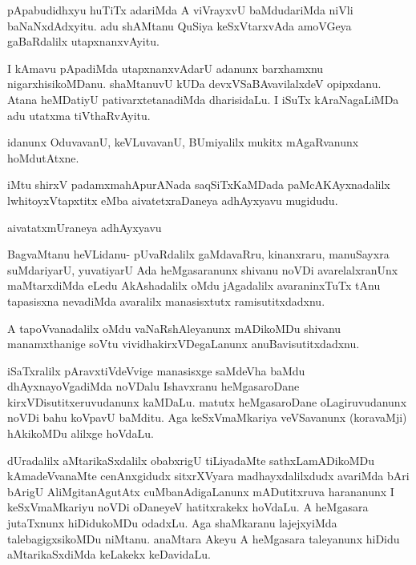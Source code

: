 \documentclass{article}
\begin{document}
\begin{mng}%
pApabudidhxyu huTiTx adariMda A viVrayxvU baMdudariMda niVli
baNaNxdAdxyitu. adu shAMtanu QuSiya keSxVtarxvAda amoVGeya gaBaRdalilx
utapxnanxvAyitu.
\end{mng}

\begin{mng}%
I kAmavu pApadiMda utapxnanxvAdarU adanunx barxhamxnu nigarxhisikoMDanu.
shaMtanuvU kUDa devxVSaBAvavilalxdeV opipxdanu. Atana
heMDatiyU pativarxtetanadiMda dharisidaLu. I iSuTx kAraNagaLiMDa adu
utatxma tiVthaRvAyitu.
\end{mng}

\begin{mng}%
idanunx OduvavanU, keVLuvavanU, BUmiyalilx mukitx
mAgaRvanunx hoMdutAtxne.
\end{mng}

\begin{center}
iMtu shirxV padamxmahApurANada saqSiTxKaMDada paMcAKAyxnadalilx lwhitoyxVtapxtitx
eMba aivatetxraDaneya adhAyxyavu mugidudu.
\end{center}

\newpage
\begin{center}
{\textbf\large{aivatatxmUraneya adhAyxyavu}}
\end{center}

\begin{mng}%
BagvaMtanu heVLidanu- pUvaRdalilx gaMdavaRru, kinanxraru,
manuSayxra suMdariyarU, yuvatiyarU Ada heMgasaranunx shivanu noVDi
avarelalxranUnx maMtarxdiMda eLedu AkAshadalilx oMdu jAgadalilx avaraninxTuTx
tAnu tapasisxna nevadiMda avaralilx manasisxtutx ramisutitxdadxnu.
\end{mng}

\begin{mng}%
A tapoVvanadalilx oMdu vaNaRshAleyanunx mADikoMDu shivanu
manamxthanige soVtu vividhakirxVDegaLanunx anuBavisutitxdadxnu.
\end{mng}

\begin{mng}%
iSaTxralilx pAravxtiVdeVvige manasisxge saMdeVha baMdu dhAyxnayoVgadiMda
noVDalu Ishavxranu heMgasaroDane kirxVDisutitxeruvudanunx kaMDaLu.
matutx heMgasaroDane oLagiruvudanunx noVDi bahu koVpavU baMditu. Aga
keSxVmaMkariya veVSavanunx (koravaMji) hAkikoMDu alilxge hoVdaLu.
\end{mng}

\begin{mng}%
dUradalilx aMtarikaSxdalilx obabxrigU tiLiyadaMte sathxLamADikoMDu
kAmadeVvanaMte cenAnxgidudx sitxrXVyara madhayxdalilxdudx avariMda bAri
bArigU AliMgitanAgutAtx cuMbanAdigaLanunx mADutitxruva harananunx I
keSxVmaMkariyu noVDi oDaneyeV hatitxrakekx hoVdaLu. A heMgasara jutaTxnunx
hiDidukoMDu odadxLu. Aga shaMkaranu lajejxyiMda talebagigxsikoMDu niMtanu.
anaMtara Akeyu A heMgasara taleyanunx hiDidu aMtarikaSxdiMda keLakekx
keDavidaLu.
\end{mng}
\end{document}
